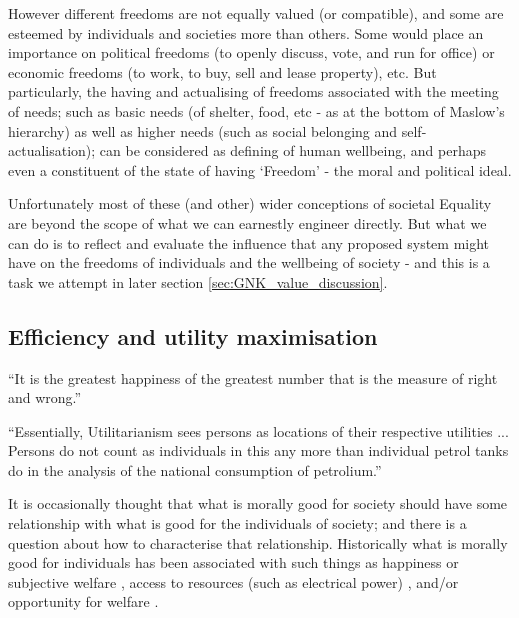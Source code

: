 However different freedoms are not equally valued (or compatible), and some are esteemed by individuals and societies more than others.
Some would place an importance on political freedoms (to openly discuss, vote, and run for office) or economic freedoms (to work, to buy, sell and lease property), etc. %
But particularly, the having and actualising of freedoms associated with the meeting of needs; such as basic needs (of shelter, food, etc - as at the bottom of Maslow's hierarchy) as well as higher needs (such as social belonging and self-actualisation); can be considered as defining of human wellbeing, and perhaps even a constituent of the state of having `Freedom' - the moral and political ideal.

Unfortunately most of these (and other) wider conceptions of societal Equality are beyond the scope of what we can earnestly engineer directly. But what we can do is to reflect and evaluate the influence that any proposed system might have on the freedoms of individuals and the wellbeing of society - and this is a task we attempt in later section \ref{sec:GNK_value_discussion}.

\subsection{Efficiency and utility maximisation}\label{sec:philosophy_efficiency}

\begin{displayquote}``It is the greatest happiness of the greatest number that is the measure of right and wrong.'' \citep{bentham2001fragment}
\end{displayquote} 

\begin{displayquote}
``Essentially, Utilitarianism sees persons as locations of their respective utilities %
 ... Persons do not count as individuals in this any more than individual petrol tanks do in the analysis of the national consumption of petrolium.''
\citep{utilitarianism_sen}
\end{displayquote}

It is occasionally thought that what is morally good for society should have some relationship with what is good for the individuals of society; and there is a question about how to characterise that relationship.
Historically what is morally good for individuals has been associated with such things as happiness \citep{burns2005happiness} or subjective welfare \citep{10.2307/2264894}, access to resources (such as electrical power) \citep{10.2307/2265047}, and/or opportunity for welfare \citep{10.2307/4320203}.%

